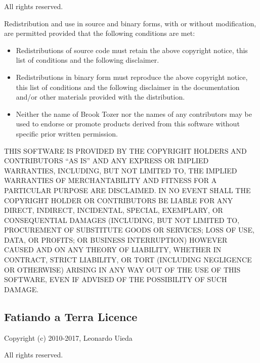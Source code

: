 \documentclass[a4paper,10pt,english]{sphinxmanual}
\begin{document}
All rights reserved.

Redistribution and use in source and binary forms, with or without modification,
are permitted provided that the following conditions are met:
\begin{itemize}
\item {} 
Redistributions of source code must retain the above copyright notice,
this list of conditions and the following disclaimer.

\item {} 
Redistributions in binary form must reproduce the above copyright notice,
this list of conditions and the following disclaimer in the documentation
and/or other materials provided with the distribution.

\item {} 
Neither the name of Brook Tozer nor the names of any contributors
may be used to endorse or promote products derived from this software
without specific prior written permission.

\end{itemize}

THIS SOFTWARE IS PROVIDED BY THE COPYRIGHT HOLDERS AND CONTRIBUTORS “AS IS” AND
ANY EXPRESS OR IMPLIED WARRANTIES, INCLUDING, BUT NOT LIMITED TO, THE IMPLIED
WARRANTIES OF MERCHANTABILITY AND FITNESS FOR A PARTICULAR PURPOSE ARE
DISCLAIMED. IN NO EVENT SHALL THE COPYRIGHT HOLDER OR CONTRIBUTORS BE LIABLE FOR
ANY DIRECT, INDIRECT, INCIDENTAL, SPECIAL, EXEMPLARY, OR CONSEQUENTIAL DAMAGES
(INCLUDING, BUT NOT LIMITED TO, PROCUREMENT OF SUBSTITUTE GOODS OR SERVICES;
LOSS OF USE, DATA, OR PROFITS; OR BUSINESS INTERRUPTION) HOWEVER CAUSED AND ON
ANY THEORY OF LIABILITY, WHETHER IN CONTRACT, STRICT LIABILITY, OR TORT
(INCLUDING NEGLIGENCE OR OTHERWISE) ARISING IN ANY WAY OUT OF THE USE OF THIS
SOFTWARE, EVEN IF ADVISED OF THE POSSIBILITY OF SUCH DAMAGE.


\subsection{Fatiando a Terra Licence}
\label{\detokenize{licence:fatiando-a-terra-licence}}
Copyright (c) 2010-2017, Leonardo Uieda

All rights reserved.
\end{document}
